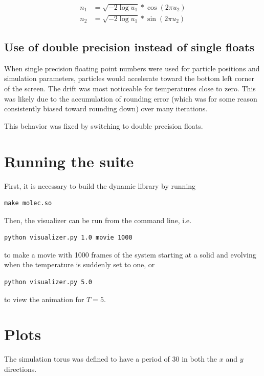 \documentclass[12pt]{article}
\begin{document}
\begin{align}
  n_1 &= \sqrt{ -2\log{u_1}} * \cos{(2\pi u_2)} \\
  n_2 &= \sqrt{ -2\log{u_1}} * \sin{(2\pi u_2)}
\end{align}

\subsection{Use of double precision instead of single floats}

When single precision floating point numbers were used for particle positions
and simulation parameters, particles would accelerate toward the bottom left
corner of the screen. The drift was most noticeable for temperatures close to
zero. This was likely due to the accumulation of rounding error (which was
for some reason consistently biased toward rounding down) over many
iterations.

This behavior was fixed by switching to double precision floats.

\section{Running the suite}

First, it is necessary to build the dynamic library by running

\begin{verbatim}
make molec.so
\end{verbatim}

Then, the visualizer can be run from the command line, i.e.

\begin{verbatim}
python visualizer.py 1.0 movie 1000
\end{verbatim}

to make a movie with 1000 frames of the system starting at a solid and
evolving when the temperature is suddenly set to one, or

\begin{verbatim}
python visualizer.py 5.0
\end{verbatim}

to view the animation for $T = 5$.

\section{Plots}

The simulation torus was defined to have a period of $30$ in both the $x$ and
$y$ directions.
\end{document}
